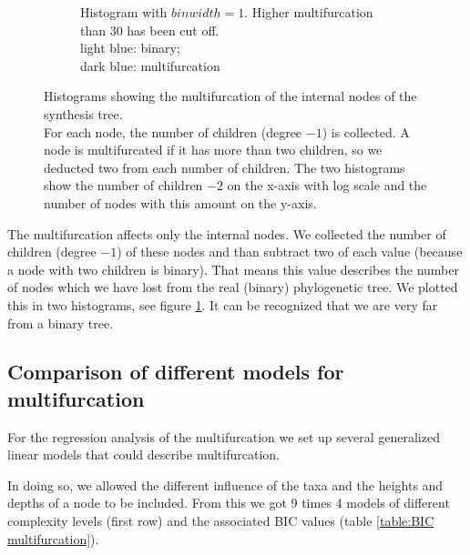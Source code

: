 \begin{figure}[h!]
\begin{subfigure}[b]{0.4\textwidth}
        \caption{Histogram with $binwidth = 1$. Higher multifurcation than 30 has been cut off. \\
          light blue: binary; \\ dark blue: multifurcation}
      \end{subfigure}
      \caption{Histograms showing the multifurcation of the internal nodes of the synthesis tree. \\
        For each node, the number of children (degree $-1$) is collected. A node is multifurcated if it
        has more than two children, so we deducted two from each number of children. The two histograms 
        show the number of children $-2$ on the x-axis with log scale and the number of nodes with this 
        amount on the y-axis.}
      \label{fig:childrenOfNodes}
    \end{figure}

    The multifurcation affects only the internal nodes. We collected the number of children (degree $-1$) 
      of these nodes and than subtract two of each value (because a node with two children is binary). 
      That means this value describes the number of nodes which we have lost from the real (binary) 
      phylogenetic tree. We plotted this in two histograms, see figure \ref{fig:childrenOfNodes}. It can 
      be recognized that we are very far from a binary tree.

    \subsection{Comparison of different models for multifurcation}
      For the regression analysis of the multifurcation we set up several generalized linear models that 
        could describe multifurcation.

      In doing so, we allowed the different influence of the taxa and the heights and depths of a node 
        to be included. From this we got 9 times 4 models of different complexity levels (first row) and 
        the associated BIC values (table \ref{table:BIC multifurcation}).


